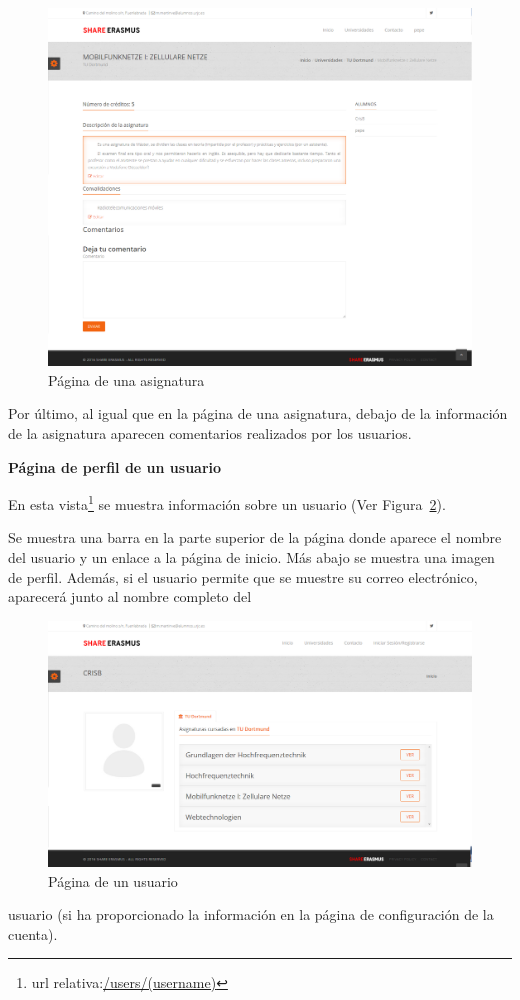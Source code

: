 \documentclass[a4paper, 12pt]{book}
\begin{document}
\begin{figure}[H]
  \centering
  \includegraphics[width=14cm, keepaspectratio]{img/asignatura.png}
  \caption{Página de una asignatura}
  \label{fig:asignatura}
\end{figure}

Por último, al igual que en la página de una asignatura, debajo de la información de la asignatura aparecen comentarios realizados por los usuarios.

{\large  \textbf{Página de perfil de un usuario}\par}

En esta vista\footnote{url relativa:\url{/users/(username)}} se muestra información sobre un usuario (Ver Figura~\ref{fig:perfil-usuario}).
\newline

Se muestra una barra en la parte superior de la página donde aparece el nombre del usuario y un enlace a la página de inicio. Más abajo se muestra una imagen de perfil. Además, si el usuario permite que se muestre su correo electrónico, aparecerá junto al nombre completo del
\begin{figure}[H]
  \centering
  \includegraphics[width=16cm, keepaspectratio]{img/perfil-usuario.png}
  \caption{Página de un usuario}
  \label{fig:perfil-usuario}
\end{figure} usuario (si ha proporcionado la información en la página de configuración de la cuenta).
\newline
\end{document}
